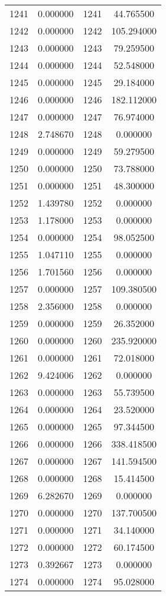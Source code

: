 \documentclass[12pt]{article}
\begin{document}
\begin{longtable}{@{}cccc@{}}
1241 & 0.000000 & 1241 & 44.765500 \\
1242 & 0.000000 & 1242 & 105.294000 \\
1243 & 0.000000 & 1243 & 79.259500 \\
1244 & 0.000000 & 1244 & 52.548000 \\
1245 & 0.000000 & 1245 & 29.184000 \\
1246 & 0.000000 & 1246 & 182.112000 \\
1247 & 0.000000 & 1247 & 76.974000 \\
1248 & 2.748670 & 1248 & 0.000000 \\
1249 & 0.000000 & 1249 & 59.279500 \\
1250 & 0.000000 & 1250 & 73.788000 \\
1251 & 0.000000 & 1251 & 48.300000 \\
1252 & 1.439780 & 1252 & 0.000000 \\
1253 & 1.178000 & 1253 & 0.000000 \\
1254 & 0.000000 & 1254 & 98.052500 \\
1255 & 1.047110 & 1255 & 0.000000 \\
1256 & 1.701560 & 1256 & 0.000000 \\
1257 & 0.000000 & 1257 & 109.380500 \\
1258 & 2.356000 & 1258 & 0.000000 \\
1259 & 0.000000 & 1259 & 26.352000 \\
1260 & 0.000000 & 1260 & 235.920000 \\
1261 & 0.000000 & 1261 & 72.018000 \\
1262 & 9.424006 & 1262 & 0.000000 \\
1263 & 0.000000 & 1263 & 55.739500 \\
1264 & 0.000000 & 1264 & 23.520000 \\
1265 & 0.000000 & 1265 & 97.344500 \\
1266 & 0.000000 & 1266 & 338.418500 \\
1267 & 0.000000 & 1267 & 141.594500 \\
1268 & 0.000000 & 1268 & 15.414500 \\
1269 & 6.282670 & 1269 & 0.000000 \\
1270 & 0.000000 & 1270 & 137.700500 \\
1271 & 0.000000 & 1271 & 34.140000 \\
1272 & 0.000000 & 1272 & 60.174500 \\
1273 & 0.392667 & 1273 & 0.000000 \\
1274 & 0.000000 & 1274 & 95.028000 \\

\end{longtable}
\end{document}
